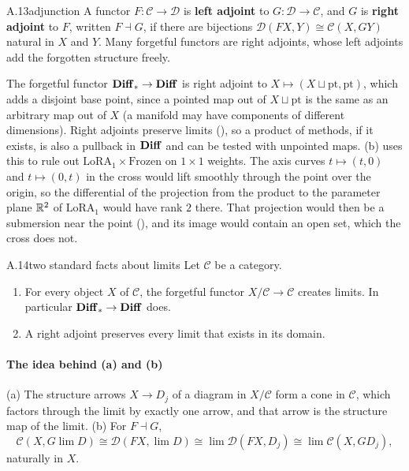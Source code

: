 \begin{bgentry}{A.13}{adjunction}
A functor $F:\mathcal C\to\mathcal D$ is \textbf{left adjoint} to $G:\mathcal D\to\mathcal C$, and $G$ is \textbf{right
adjoint} to $F$, written $F\dashv G$, if there are bijections $\mathcal D(FX,Y)\cong\mathcal C(X,GY)$ natural in $X$ and
$Y$. Many forgetful functors are right adjoints, whose left adjoints add the forgotten structure freely.
\end{bgentry}

The forgetful functor $\mathbf{Diff}_*\to\mathbf{Diff}$ is right adjoint to $X\mapsto(X\sqcup\mathrm{pt},\mathrm{pt})$, which adds a
disjoint base point, since a pointed map out of $X\sqcup\mathrm{pt}$ is the same as an arbitrary map out of $X$ (a
manifold may have components of different dimensions). Right adjoints preserve limits (), so a product of
methods, if it exists, is also a pullback in $\mathbf{Diff}$ and can be tested with unpointed maps.
(b) uses this to rule out $\mathrm{LoRA}_1\times\text{Frozen}$ on $1\times1$ weights. The axis
curves $t\mapsto(t,0)$ and $t\mapsto(0,t)$ in the cross would lift smoothly through the point over the origin, so the
differential of the projection from the product to the parameter plane $\mathbb{R}^2$ of $\mathrm{LoRA}_1$ would have rank $2$
there. That projection would then be a submersion near the point (), and its image would contain an open set,
which the cross does not.


\begin{bgfact}{A.14}{two standard facts about limits}
Let $\mathcal C$ be a category.
\begin{enumerate}[label=(\alph*)]
  \item For every object $X$ of $\mathcal C$, the forgetful functor $X/\mathcal C\to\mathcal C$ creates limits. In
    particular $\mathbf{Diff}_*\to\mathbf{Diff}$ does.
  \item A right adjoint preserves every limit that exists in its domain.
\end{enumerate}
\end{bgfact}

\paragraph{The idea behind (a) and (b)}
(a) The structure arrows $X\to D_j$ of a diagram in $X/\mathcal C$ form a cone in $\mathcal C$, which factors through
the limit by exactly one arrow, and that arrow is the structure map of the limit. (b) For $F\dashv G$,
\begin{equation*}
  \mathcal C(X,G\lim D)\cong\mathcal D(FX,\lim D)\cong\lim\mathcal D(FX,D_j)\cong\lim\mathcal C(X,GD_j),
\end{equation*}
naturally in $X$.

